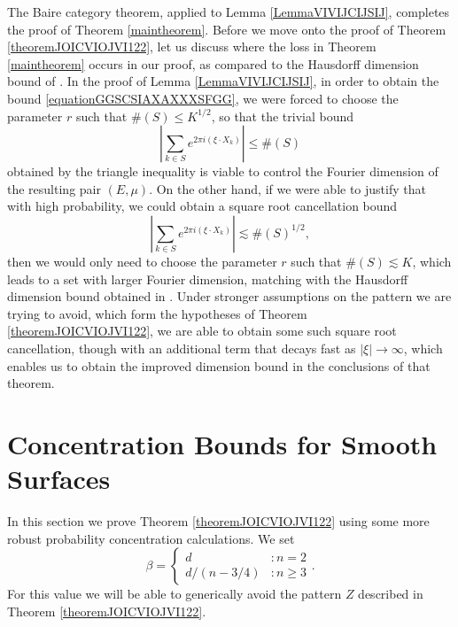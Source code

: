 \documentclass[dvipsnames,letterpaper,12pt]{article}
\numberwithin{equation}{section}
\numberwithin{theorem}{section}
\begin{document}
The Baire category theorem, applied to Lemma \ref{LemmaVIVIJCIJSIJ}, completes the proof of Theorem \ref{maintheorem}. Before we move onto the proof of Theorem \ref{theoremJOICVIOJVI122}, let us discuss where the loss in Theorem \ref{maintheorem} occurs in our proof, as compared to the Hausdorff dimension bound of \cite{OurPaper}. In the proof of Lemma \ref{LemmaVIVIJCIJSIJ}, in order to obtain the bound \eqref{equationGGSCSIAXAXXXSFGG}, we were forced to choose the parameter $r$ such that $\#(S) \leq K^{1/2}$, so that the trivial bound
%
\begin{equation}
    \left| \sum_{k \in S} e^{2 \pi i (\xi \cdot X_k)} \right| \leq \#(S)
\end{equation}
%
obtained by the triangle inequality is viable to control the Fourier dimension of the resulting pair $(E,\mu)$. On the other hand, if we were able to justify that with high probability, we could obtain a square root cancellation bound
%
\begin{equation}
    \left| \sum_{k \in S} e^{2 \pi i (\xi \cdot X_k)} \right| \lesssim \#(S)^{1/2},
\end{equation}
%
then we would only need to choose the parameter $r$ such that $\#(S) \lesssim K$, which leads to a set with larger Fourier dimension, matching with the Hausdorff dimension bound obtained in \cite{OurPaper}. Under stronger assumptions on the pattern we are trying to avoid, which form the hypotheses of Theorem \ref{theoremJOICVIOJVI122}, we are able to obtain some such square root cancellation, though with an additional term that decays fast as $|\xi| \to \infty$, which enables us to obtain the improved dimension bound in the conclusions of that theorem.

\section{Concentration Bounds for Smooth Surfaces}

In this section we prove Theorem \ref{theoremJOICVIOJVI122} using some more robust probability concentration calculations. We set
%
\[ \beta = \begin{cases} d &: n = 2 \\ d/(n - 3/4) &: n \geq 3 \end{cases}. \]
%
For this value we will be able to generically avoid the pattern $Z$ described in Theorem \ref{theoremJOICVIOJVI122}.
\end{document}
